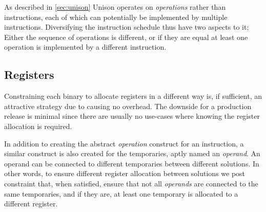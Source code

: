As described in \ref{sec:unison} Unison operates on \textit{operations} rather than
instructions, each of which can potentially be implemented by multiple instructions.
Diversifying the instruction schedule thus have two aspects to it; Either the sequence of
operations is different, or if they are equal at least one operation is implemented by a
different instruction.

\subsection{Registers}

Constraining each binary to allocate registers in a different way is, if sufficient, an
attractive strategy due to causing no overhead. The downside for a production release is
minimal since there are usually no use-cases where knowing the register allocation is required.

In addition to creating the abstract \textit{operation} construct for an instruction, a
similar construct is also created for the temporaries, aptly named an \textit{operand}.
An operand can be connected to different temporaries between different solutions. In other
words, to ensure different register allocation between solutions we post constraint that,
when satisfied, ensure that not all \textit{operands} are connected to the same temporaries,
and if they are, at least one temporary is allocated to a different register.
